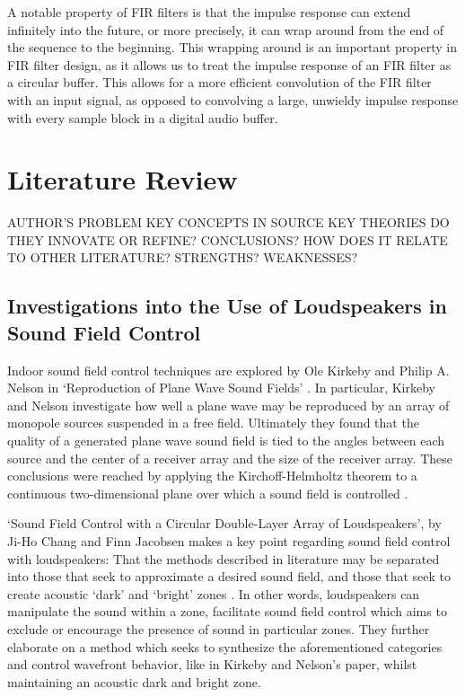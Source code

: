 \documentclass{report}
\begin{document}
        A notable property of FIR filters is that the impulse response can extend infinitely into the future, or more precisely, it can wrap around from the end of the sequence to the beginning.
        This wrapping around is an important property in FIR filter design, as it allows us to treat the impulse response of an FIR filter as a circular buffer.
        This allows for a more efficient convolution of the FIR filter with an input signal, as opposed to convolving a large, unwieldy impulse response with every sample block in a digital audio buffer.

        
\chapter{Literature Review}
    AUTHOR'S PROBLEM
    KEY CONCEPTS IN SOURCE
    KEY THEORIES
    DO THEY INNOVATE OR REFINE?
    CONCLUSIONS?
    HOW DOES IT RELATE TO OTHER LITERATURE?
    STRENGTHS?
    WEAKNESSES?

    \section{Investigations into the Use of Loudspeakers in Sound Field Control}

        Indoor sound field control techniques are explored by Ole Kirkeby and Philip A. Nelson in `Reproduction of Plane Wave Sound Fields' \cite{kirkeby1993reproduction}.
        In particular, Kirkeby and Nelson investigate how well a plane wave may be reproduced by an array of monopole sources suspended in a free field.
        Ultimately they found that the quality of a generated plane wave sound field is tied to the angles between each source and the center of a receiver array and the size of the receiver array.
        These conclusions were reached by applying the Kirchoff-Helmholtz theorem to a continuous two-dimensional plane over which a sound field is controlled \cite{kirkeby1993reproduction}.

        `Sound Field Control with a Circular Double-Layer Array of Loudspeakers', by Ji-Ho Chang and Finn Jacobsen makes a key point regarding sound field control with loudspeakers: That the methods described in literature may be separated into those that seek to approximate a desired sound field, and those that seek to create acoustic `dark' and `bright' zones \cite{chang2012sound}.
        In other words, loudspeakers can manipulate the sound within a zone, facilitate sound field control which aims to exclude or encourage the presence of sound in particular zones.
        They further elaborate on a method which seeks to synthesize the aforementioned categories and control wavefront behavior, like in Kirkeby and Nelson's paper, whilst maintaining an acoustic dark and bright zone.
\end{document}

